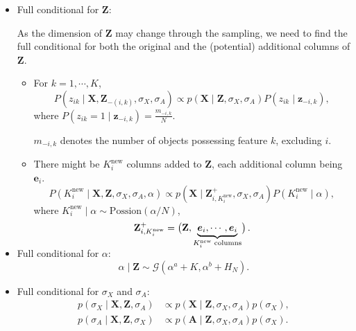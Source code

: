 \documentclass{article}
\begin{document}
\begin{itemize}
  \item Full conditional for $\mathbf{Z}$:
  
  As the dimension of $\mathbf{Z}$ may change through the sampling, we need to find the full conditional for both the original and the (potential) additional columns of $\mathbf{Z}$.
  \begin{itemize}
    \item For $k = 1, \cdots, K$, \begin{equation}P(z_{ik}\mid \mathbf{X},\mathbf{Z}_{-(i,k)}, \sigma_X, \sigma_A)\propto p(\mathbf{X}\mid \mathbf{Z}, \sigma_X, \sigma_A)P(z_{ik}\mid \boldsymbol{z}_{-i, k}),\end{equation}
    where $P(z_{ik} = 1\mid\boldsymbol{z}_{-i, k}) = \frac{m_{-i, k}}{N}$.

    $m_{-i,k}$ denotes the number of objects possessing feature $k$, excluding $i$.
    \item There might be $K_i^\text{new}$ columns added to $\mathbf{Z}$, each additional column being $\boldsymbol{e}_i$.
    \begin{equation}P(K_i^\text{new}\mid \mathbf{X},\mathbf{Z},\sigma_X,\sigma_A,\alpha) \propto p(\mathbf{X}\mid \mathbf{Z}_{i,K_i^\text{new}}^{+},\sigma_X,\sigma_A)P(K_i^\text{new}\mid\alpha),\end{equation}
    where $K_i^\text{new}\mid \alpha \sim \mathrm{Possion}(\alpha/N)$, 
    \begin{equation}\mathbf{Z}_{i,K_i^\text{new}}^+ = \begin{pmatrix}
      \mathbf{Z}, \smash{\underbrace{\boldsymbol{e}_i, \cdots, \boldsymbol{e}_i}_{K_i^\mathrm{new}\text{ columns}}}
    \end{pmatrix}.\end{equation}
  \end{itemize}
  \item Full conditional for $\alpha$:
  \begin{equation}\alpha\mid \mathbf{Z}\sim \mathcal{G}(\alpha^a + K, \alpha^b + H_N).\end{equation}
  \item Full conditional for $\sigma_X$ and $\sigma_A$:
  \begin{equation}
  \begin{aligned}
    p(\sigma_X\mid \mathbf{X}, \mathbf{Z}, \sigma_A) &\propto p(\mathbf{X}\mid \mathbf{Z},\sigma_X, \sigma_A) p(\sigma_X), \\
    p(\sigma_A\mid \mathbf{X}, \mathbf{Z}, \sigma_X) &\propto p(\mathbf{A}\mid \mathbf{Z},\sigma_X, \sigma_A) p(\sigma_X). \\
  \end{aligned}
\end{equation}
\end{itemize}
\end{document}
